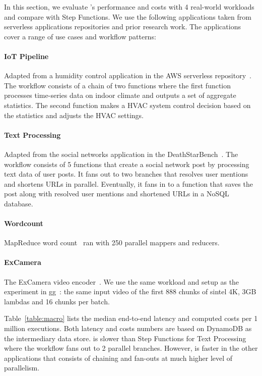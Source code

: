 In this section, we evaluate \name{}'s performance and costs with 4 real-world
workloads and compare with Step Functions. We use the following applications
taken from serverless applications repositories and prior research work. The
applications cover a range of use cases and workflow patterns:

\paragraph{IoT Pipeline} Adapted from a humidity control application in the
AWS serverless repository~\cite{iot-pipeline}. The workflow consists of a
chain of two functions where the first function processes time-series data on
indoor climate and outputs a set of aggregate statistics. The second function
makes a HVAC system control decision based on the statistics and adjusts the
HVAC settings.

\paragraph{Text Processing} Adapted from the social networks application in
the DeathStarBench~\cite{deathstar}. The workflow consists of 5 functions that
create a social network post by processing text data of user posts. It fans
out to two branches that resolves user mentions and shortens URLs in parallel.
Eventually, it fans in to a function that saves the post along with resolved
user mentions and shortened URLs in a NoSQL database.

\paragraph{Wordcount} MapReduce word count~\cite{mapreduce} ran with 250
parallel mappers and reducers.

\paragraph{ExCamera} The ExCamera video encoder~\cite{excamera, gg-atc}. We
use the same workload and setup as the experiment in gg~\cite{gg-atc}: the same
input video of the first 888 chunks of sintel 4K, 3GB lambdas and 16 chunks
per batch.

Table~\ref{table:macro} lists the median end-to-end latency and computed costs
per 1 million executions. Both latency and costs numbers are based on DynamoDB
as the intermediary data store. \name{} is slower than Step Functions for Text
Processing where the workflow fans out to 2 parallel branches. However,
\name{} is faster in the other applications that consists of chaining and
fan-outs at much higher level of parallelism.

